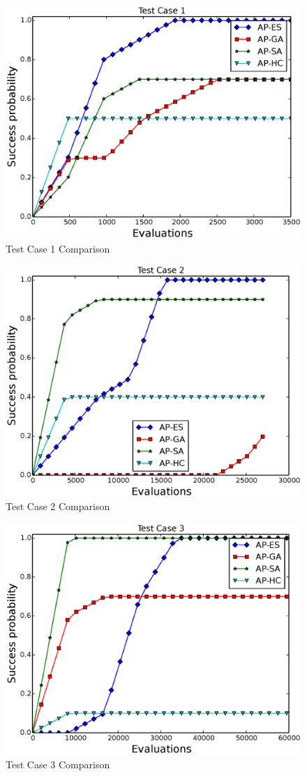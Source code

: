\documentclass{sig-alternate}
\begin{document}
\begin{figure}
    \begin{center}
        \includegraphics[width=.49\textwidth]{FIG/tc1_sp.eps}
\end{center}
\caption{Test Case 1 Comparison}
\label{fig:tc1}
\end{figure}

\begin{figure}
    \begin{center}
        \includegraphics[width=.49\textwidth]{FIG/tc2_sp.eps}
\end{center}
\caption{Test Case 2 Comparison}
\label{fig:tc2}
\end{figure}

\begin{figure}
    \begin{center}
        \includegraphics[width=.49\textwidth]{FIG/tc3_sp.eps}
\end{center}
\caption{Test Case 3 Comparison}
\label{fig:tc3}
\end{figure}
\end{document}
